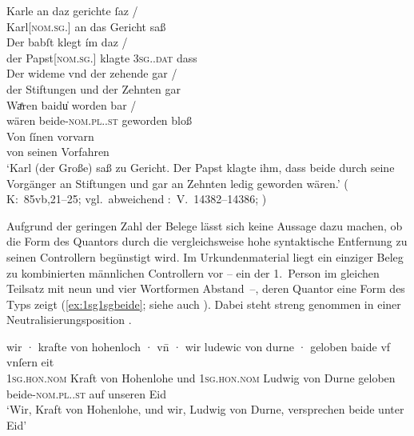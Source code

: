 \begin{exe}
\ex \label{ex:baideuwarn3}
	\gll Karle an daz gerichte ſaz {/} \\
	    Karl[\textsc{nom.sg.\MascM}] an das Gericht saß \\
	\gll Der babſt klegt ím daz {/} \\
		der Papst[\textsc{nom.sg.\MascM}] klagte \textsc{3sg.\MascM.dat} dass \\
	\gll Der wideme vnd der zehende gar {/} \\
		der Stiftungen und der Zehnten gar \\
	\gll Waͤren baidu̍ worden bar {/} \\
		wären beide-\textsc{nom.pl.\NeutM.st} geworden bloß \\
	\gll Von ſínen vorvarn \\
		von seinen Vorfahren \\
	\trans `Karl (der Große) saß zu Gericht. Der Papst klagte ihm, dass
		beide durch seine Vorgänger an Stiftungen und gar an Zehnten ledig
		geworden wären.'
		(%
			K:~85vb,21--25; vgl.~abweichend
			\KC:~V.~14382--14386;
			\cite[341]{schroeder1895}%
		)
\end{exe}

Aufgrund der geringen Zahl der Belege lässt sich keine Aussage dazu machen, ob
die Form des Quantors durch die vergleichsweise hohe syntaktische Entfernung zu
seinen Controllern begünstigt wird. Im Urkundenmaterial liegt ein einziger
Beleg zu kombinierten männlichen Controllern vor -- ein 
der 1.~Person im gleichen Teilsatz mit neun und vier Wortformen
Abstand~--, deren Quantor eine Form des Typs 
zeigt (\ref{ex:1sg1sgbeide}; siehe auch ). Dabei steht
 streng genommen in einer Neutralisierungsposition
\autocites[vgl.][90--91]{askedal1973}[191]{gjelsten1980}.

\begin{exe}
\ex\label{ex:1sg1sgbeide}
	\gll wir · krafte von hohenloch · vn̄ · wir
		ludewic von durne · geloben baide vf vnſern eit \\
		\textsc{1sg\subM.hon.nom} {} Kraft von Hohenlohe {} und {}
		\textsc{1sg\subM.hon.nom} Ludwig von Durne {} geloben
		beide-\textsc{nom.pl.\MascM.st} auf unseren Eid \\
	\trans `Wir, Kraft von Hohenlohe, und wir, Ludwig von Durne,
		versprechen beide unter Eid'
		\parencites(Nr.~2529, Burg Hohlach, Kr.~Neustadt an der Aisch-Bad Windsheim, 1296)[563,5--6]{cao3}%
\end{exe}

